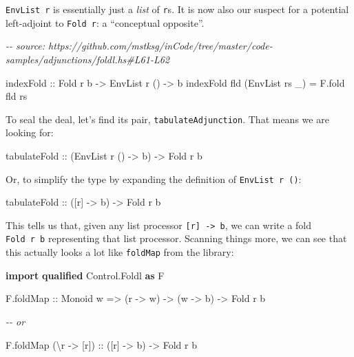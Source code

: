 \documentclass[]{article}
\newenvironment{Shaded}{}{}
\newcommand{\CommentTok}[1]{\textcolor[rgb]{0.38,0.63,0.69}{\textit{#1}}}
\newcommand{\DataTypeTok}[1]{\textcolor[rgb]{0.56,0.13,0.00}{#1}}
\newcommand{\KeywordTok}[1]{\textcolor[rgb]{0.00,0.44,0.13}{\textbf{#1}}}
\newcommand{\NormalTok}[1]{#1}
\newcommand{\OtherTok}[1]{\textcolor[rgb]{0.00,0.44,0.13}{#1}}
\begin{document}
\texttt{EnvList\ r} is essentially just a \emph{list} of \texttt{r}s. It is now
also our suspect for a potential left-adjoint to \texttt{Fold\ r}: a
``conceptual opposite''.

\begin{Shaded}
\begin{Highlighting}[]
\CommentTok{{-}{-} source: https://github.com/mstksg/inCode/tree/master/code{-}samples/adjunctions/foldl.hs\#L61{-}L62}

\OtherTok{indexFold ::} \DataTypeTok{Fold}\NormalTok{ r b }\OtherTok{{-}>} \DataTypeTok{EnvList}\NormalTok{ r () }\OtherTok{{-}>}\NormalTok{ b}
\NormalTok{indexFold fld (}\DataTypeTok{EnvList}\NormalTok{ rs \_) }\OtherTok{=}\NormalTok{ F.fold fld rs}
\end{Highlighting}
\end{Shaded}

To seal the deal, let's find its pair, \texttt{tabulateAdjunction}. That means
we are looking for:

\begin{Shaded}
\begin{Highlighting}[]
\OtherTok{tabulateFold ::}\NormalTok{ (}\DataTypeTok{EnvList}\NormalTok{ r () }\OtherTok{{-}>}\NormalTok{ b) }\OtherTok{{-}>} \DataTypeTok{Fold}\NormalTok{ r b}
\end{Highlighting}
\end{Shaded}

Or, to simplify the type by expanding the definition of \texttt{EnvList\ r\ ()}:

\begin{Shaded}
\begin{Highlighting}[]
\OtherTok{tabulateFold ::}\NormalTok{ ([r] }\OtherTok{{-}>}\NormalTok{ b) }\OtherTok{{-}>} \DataTypeTok{Fold}\NormalTok{ r b}
\end{Highlighting}
\end{Shaded}

This tells us that, given any list processor
\texttt{{[}r{]}\ -\textgreater{}\ b}, we can write a fold \texttt{Fold\ r\ b}
representing that list processor. Scanning things more, we can see that this
actually looks a lot like \texttt{foldMap} from the library:

\begin{Shaded}
\begin{Highlighting}[]
\KeywordTok{import} \KeywordTok{qualified} \DataTypeTok{Control.Foldl} \KeywordTok{as} \DataTypeTok{F}

\NormalTok{F.foldMap}
\OtherTok{    ::} \DataTypeTok{Monoid}\NormalTok{ w}
    \OtherTok{=>}\NormalTok{ (r }\OtherTok{{-}>}\NormalTok{ w)}
    \OtherTok{{-}>}\NormalTok{ (w }\OtherTok{{-}>}\NormalTok{ b)}
    \OtherTok{{-}>} \DataTypeTok{Fold}\NormalTok{ r b}

\CommentTok{{-}{-} or}

\NormalTok{F.foldMap (\textbackslash{}r }\OtherTok{{-}>}\NormalTok{ [r])}
\OtherTok{    ::}\NormalTok{ ([r] }\OtherTok{{-}>}\NormalTok{ b)}
    \OtherTok{{-}>} \DataTypeTok{Fold}\NormalTok{ r b}
\end{Highlighting}
\end{Shaded}
\end{document}
